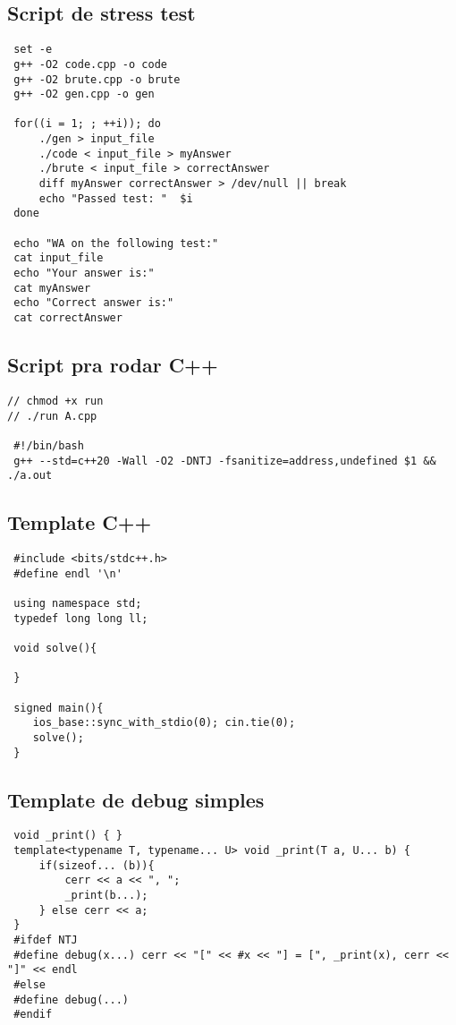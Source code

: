 \documentclass[11pt, a4paper, twoside]{article}
\begin{document}
\subsection{Script de stress test}
\begin{lstlisting}
 set -e
 g++ -O2 code.cpp -o code
 g++ -O2 brute.cpp -o brute
 g++ -O2 gen.cpp -o gen
 
 for((i = 1; ; ++i)); do
     ./gen > input_file
     ./code < input_file > myAnswer
     ./brute < input_file > correctAnswer
     diff myAnswer correctAnswer > /dev/null || break
     echo "Passed test: "  $i
 done
 
 echo "WA on the following test:"
 cat input_file
 echo "Your answer is:"
 cat myAnswer
 echo "Correct answer is:"
 cat correctAnswer
\end{lstlisting}

\subsection{Script pra rodar C++}
\begin{lstlisting}
// chmod +x run
// ./run A.cpp

 #!/bin/bash
 g++ --std=c++20 -Wall -O2 -DNTJ -fsanitize=address,undefined $1 && ./a.out
\end{lstlisting}

\subsection{Template C++}
\begin{lstlisting}
 #include <bits/stdc++.h>
 #define endl '\n'
 
 using namespace std;
 typedef long long ll;
 
 void solve(){
 
 }
 
 signed main(){
 	ios_base::sync_with_stdio(0); cin.tie(0);
 	solve();
 }
\end{lstlisting}

\subsection{Template de debug simples}
\begin{lstlisting}
 void _print() { }
 template<typename T, typename... U> void _print(T a, U... b) {
     if(sizeof... (b)){
         cerr << a << ", ";
         _print(b...);
     } else cerr << a;
 }
 #ifdef NTJ
 #define debug(x...) cerr << "[" << #x << "] = [", _print(x), cerr << "]" << endl
 #else
 #define debug(...)
 #endif
\end{lstlisting}
\end{document}
